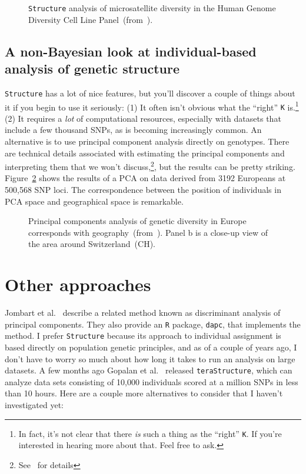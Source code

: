 \documentclass[12pt]{article}
\begin{document}
\begin{figure}
\caption{{\tt Structure} analysis of microsatellite diversity in the
  Human Genome Diversity Cell Line
  Panel~(from~\cite{Rosenberg-etal-2002}).}\label{fig:HGDP-CEPH} 
\end{figure}

\subsection*{A non-Bayesian look at individual-based analysis of
  genetic structure}

{\tt Structure} has a lot of nice features, but you'll discover a
couple of things about it if you begin to use it seriously: (1) It
often isn't obvious what the ``right'' {\tt K} is.\footnote{In fact,
  it's not clear that there {\it is\/} such a thing as the ``right''
  {\tt K}. If you're interested in hearing more about that. Feel free
  to ask.} (2) It requires a {\it lot\/} of computational resources,
especially with datasets that include a few thousand SNPs, as is
becoming increasingly common. An alternative is to use principal
component analysis directly on genotypes. There are technical details
associated with estimating the principal components and interpreting
them that we won't discuss,\footnote{See~\cite{Novembre-Stephens-2008}
  for details}, but the results can be pretty
striking. Figure~\ref{fig:human-PCA} shows the results of a PCA on
data derived from 3192 Europeans at 500,568 SNP loci. The
correspondence between the position of individuals in PCA space and
geographical space is remarkable. 

\begin{figure}
\caption{Principal components analysis of genetic diversity in Europe
  corresponds with
  geography~(from~\cite{Novembre-etal-2008}). Panel b is a close-up
  view of the area around Switzerland~(CH).}\label{fig:human-PCA}
\end{figure}

\section*{Other approaches}

Jombart et al.~\cite{Jombart-etal-2010} describe a related method
known as discriminant analysis of principal components. They also
provide an {\tt R} package, {\tt dapc}, that implements the
method. I prefer
{\tt Structure} because its approach to individual assignment is based
directly on population genetic principles, and as of a couple of years
ago, I don't have to worry so much about how long it takes to run an
analysis on large datasets. A few months ago Gopalan et
al.~\cite{Gopalan-etal-2016} released {\tt teraStructure}, which can
analyze data sets consisting of 10,000 individuals scored at a million
SNPs in less than 10
hours. Here are a couple
more alternatives to consider that I haven't investigated yet:
\end{document}
